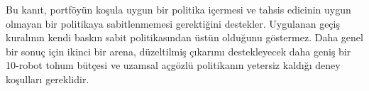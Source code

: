 \documentclass[10pt,letterpaper,onecolumn]{IEEEtran}
\begin{document}
Bu kanıt, portföyün koşula uygun bir politika içermesi ve tahsis edicinin uygun
olmayan bir politikaya sabitlenmemesi gerektiğini destekler. Uygulanan geçiş
kuralının kendi baskın sabit politikasından üstün olduğunu göstermez. Daha
genel bir sonuç için ikinci bir arena, düzeltilmiş çıkarımı destekleyecek daha
geniş bir 10-robot tohum bütçesi ve uzamsal açgözlü politikanın yetersiz kaldığı
deney koşulları gereklidir.



\end{document}
